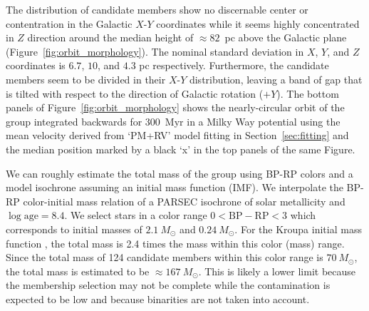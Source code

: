 \documentclass[modern,letterpaper]{aastex61}
\newcommand{\sectionname}{Section}
\newcommand{\figname}{Figure}
\begin{document}
The distribution of candidate members show no discernable center or
contentration in the Galactic $X$-$Y$ coordinates while it seems highly
concentrated in $Z$ direction around the median height of $\approx 82$~pc above
the Galactic plane (Figure~\ref{fig:orbit_morphology}).
The nominal standard deviation in $X$, $Y$, and $Z$ coordinates
is $6.7$, $10$, and $4.3$ pc respectively.
Furthermore, the candidate members seem to be divided in their $X$-$Y$
distribution, leaving a band of gap that is tilted with respect to the direction
of Galactic rotation ($+Y$).
The bottom panels of \figname~\ref{fig:orbit_morphology} shows the
nearly-circular orbit of the group integrated backwards for $300$~Myr in a Milky
Way potential \citep{2015ApJS..216...29B} using the mean velocity derived from
`PM+RV' model fitting in \sectionname~\ref{sec:fitting} and the median position
marked by a black `x' in the top panels of the same \figname.

We can roughly estimate the total mass of the group using BP-RP colors
and a model isochrone assuming an initial mass function (IMF).
We interpolate the BP-RP color-initial mass relation of a PARSEC isochrone of
solar metallicity and $\log\mathrm{age}=8.4$.
We select stars in a color range $0<\mathrm{BP-RP}<3$ which corresponds to
initial masses of $2.1~M_\odot$ and $0.24~M_\odot$.
For the Kroupa initial mass function \citep{2001MNRAS.322..231K},
the total mass is 2.4 times the mass within this color (mass) range.
Since the total mass of 124 candidate members within this color range is
$70~M_\odot$, the total mass is estimated to be $\approx167~M_\odot$.
This is likely a lower limit because
the membership selection may not be complete while the contamination is expected
to be low and because binarities are not taken into account.

\end{document}
